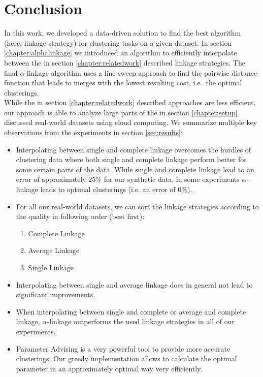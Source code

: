 \chapter{Conclusion}

In this work, we developed a data-driven solution to find the best algorithm (here: linkage strategy) for clustering tasks on a given dataset. In section \ref{chapter:alphalinkage} we introduced an algorithm to efficiently interpolate between the in section \ref{chapter:relatedwork} described linkage strategies. The final $\alpha$-linkage algorithm uses a line sweep approach to find the pairwise distance function that leads to merges with the lowest resulting cost, i.e.\ the optimal clusterings.\\

While the in section \ref{chapter:relatedwork} described approaches are less efficient, our approach is able to analyze large parts of the in section \ref{chapter:setup}  discussed real-world datasets using cloud computing. We summarize multiple key observations from the experiments in section \ref{sec:results}:
\begin{itemize}
\item Interpolating between single and complete linkage overcomes the hurdles of clustering data where both single and complete linkage perform better for some certain parts of the data. While single and complete linkage lead to an error of approximately $25\%$ for our synthetic data, in some experiments $\alpha$-linkage leads to optimal clusterings (i.e. an error of $0\%$).
\item For all our real-world datasets, we can sort the linkage strategies according to the quality in following order (best first):
\begin{enumerate}
\item Complete Linkage
\item Average Linkage
\item Single Linkage
\end{enumerate}
\item Interpolating between single and average linkage does in general not lead to significant improvements.
\item When interpolating between single and complete or average and complete linkage, $\alpha$-linkage outperforms the used linkage strategies in all of our experiments.
\item Parameter Advising is a very powerful tool to provide more accurate clusterings. Our greedy implementation allows to calculate the optimal parameter in an approximately optimal way very efficiently.
\end{itemize}

